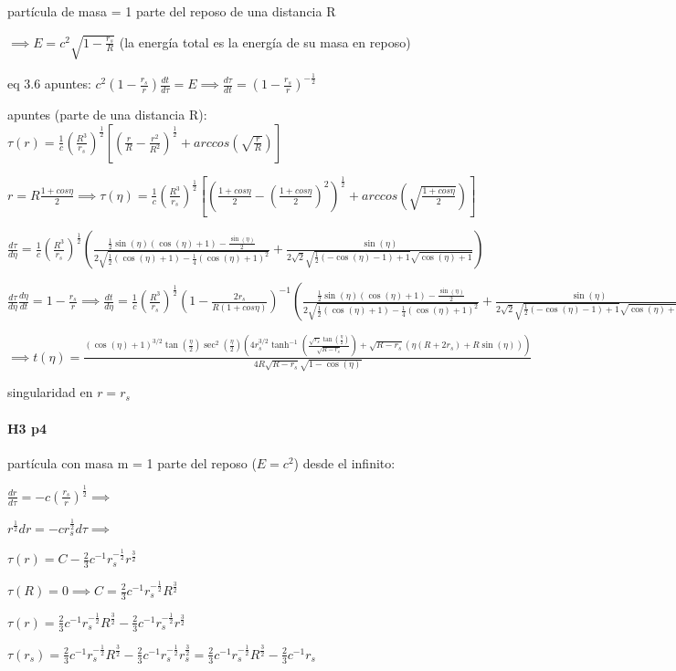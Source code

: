 \documentclass[12pt]{book}
\begin{document}
partícula de masa = 1 parte del  reposo de una distancia R 

$\implies E = c^2 \sqrt{1-\frac{r_s}{R}}$  (la energía total es la energía de su masa en reposo)

eq 3.6 apuntes: $ c^2(1-\frac{r_s}{r}) \frac{dt}{d\tau} = E \implies \frac{d\tau}{dt} = (1-\frac{r_s}{r})^{-\frac{1}{2}}  $

apuntes (parte de una distancia R): $\tau(r) = \frac{1}{c} (\frac{R^3}{r_s})^{\frac{1}{2}} [(\frac{r}{R} -\frac{r^2}{R^2})^{\frac{1}{2}} + arccos(\sqrt{\frac{r}{R}}) ] $

$r = R \frac{1+cos \eta}{2} \implies \tau(\eta) = \frac{1}{c} (\frac{R^3}{r_s})^{\frac{1}{2}} [(\frac{1+cos \eta}{2} -(\frac{1+cos \eta}{2}) ^2)^{\frac{1}{2}} + arccos(\sqrt{\frac{1+cos \eta}{2}}) ] $

$\frac{d\tau}{d\eta} =  \frac{1}{c} (\frac{R^3}{r_s})^{\frac{1}{2}} ( \frac{\frac{1}{2} \sin (\eta) (\cos (\eta)+1)-\frac{\sin (\eta)}{2}}{2 \sqrt{\frac{1}{2} (\cos (\eta)+1)-\frac{1}{4} (\cos (\eta)+1)^2}} + \frac{\sin (\eta)}{2 \sqrt{2} \sqrt{\frac{1}{2} (-\cos (\eta)-1)+1} \sqrt{\cos (\eta)+1}} )$

$\frac{d\tau}{d\eta} \frac{d\eta}{dt} = 1-\frac{r_s}{r} \implies \frac{dt}{d\eta} =  \frac{1}{c} (\frac{R^3}{r_s})^{\frac{1}{2}} (1-\frac{2 r_s}{R(1+cos \eta)})^{-1} ( \frac{\frac{1}{2} \sin (\eta) (\cos (\eta)+1)-\frac{\sin (\eta)}{2}}{2 \sqrt{\frac{1}{2} (\cos (\eta)+1)-\frac{1}{4} (\cos (\eta)+1)^2}} + \frac{\sin (\eta)}{2 \sqrt{2} \sqrt{\frac{1}{2} (-\cos (\eta)-1)+1} \sqrt{\cos (\eta)+1}} ) $

$\implies t(\eta) = \frac{(\cos (\eta)+1)^{3/2} \tan \left(\frac{\eta}{2}\right) \sec ^2\left(\frac{\eta}{2}\right) \left(4 r_s^{3/2} \tanh ^{-1}\left(\frac{\sqrt{r_s} \tan \left(\frac{\eta}{2}\right)}{\sqrt{R-r_s}}\right)+\sqrt{R-r_s} (\eta (R+2 r_s)+R \sin (\eta))\right)}{4 R \sqrt{R-r_s} \sqrt{1-\cos (\eta)}}$

singularidad en $r=r_s$

\paragraph{H3 p4}

partícula con masa m = 1 parte del reposo ($E = c^2$) desde el infinito:

$\frac{dr}{d\tau} = -c (\frac{r_s}{r})^{\frac{1}{2}} \implies$

$r^{\frac{1}{2}} dr = -c r_s^{\frac{1}{2}} d\tau \implies$

$\tau(r) = C -\frac{2}{3}c^{-1}r_s^{-\frac{1}{2}} r^{\frac{3}{2}} $

$\tau(R) = 0 \implies C =  \frac{2}{3}c^{-1}r_s^{-\frac{1}{2}} R^{\frac{3}{2}} $

$\tau(r) = \frac{2}{3}c^{-1}r_s^{-\frac{1}{2}} R^{\frac{3}{2}}  -\frac{2}{3}c^{-1}r_s^{-\frac{1}{2}} r^{\frac{3}{2}} $

$\tau(r_s) = \frac{2}{3}c^{-1}r_s^{-\frac{1}{2}} R^{\frac{3}{2}}  -\frac{2}{3}c^{-1}r_s^{-\frac{1}{2}} r_s^{\frac{3}{2}} = \frac{2}{3}c^{-1}r_s^{-\frac{1}{2}} R^{\frac{3}{2}}  -\frac{2}{3}c^{-1}r_s$
\end{document}
